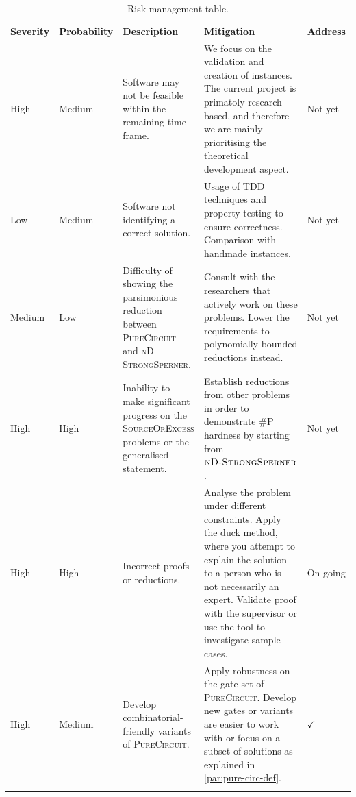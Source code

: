 \begin{xltabular}{0.95\linewidth}{|Z{1.2cm}|Z{1.75cm}|Y|Y|Z{1.2cm}|}
        \hline
        \textbf{Severity} & \textbf{Probability} & \textbf{Description} & \textbf{Mitigation} & \textbf{Address} \\
        \hhline{|=|=|=|=|=|}
        High   & Medium & Software may not be feasible within the remaining time frame. & We focus on the validation and creation of instances.
        The current project is primatoly research-based, and therefore we are mainly prioritising the theoretical development aspect. & Not yet      \\ \hline
        Low    & Medium & Software not identifying a correct solution. & Usage of TDD techniques and property testing to ensure correctness.  Comparison with handmade instances. & Not yet      \\ \hline
        Medium & Low    & Difficulty of showing the parsimonious reduction between  \textsc{PureCircuit} and  \textsc{nD-StrongSperner}. & Consult with the researchers that actively work on these problems. Lower the requirements
               to polynomially bounded reductions instead. &  Not yet \\ \hline
        High   & High   & Inability to make significant progress on the \textsc{SourceOrExcess} problems or the generalised statement. &
        Establish reductions from other problems in order to demonstrate \textsc{\#P} hardness by starting from $\textsc{nD-StrongSperner}$. & Not yet \\ \hline
        High   & High   & Incorrect proofs or reductions. &
        Analyse the problem under different constraints.
            Apply the duck method, where you attempt to explain the solution to a person who is not necessarily an expert. Validate proof with the supervisor or
               use the tool to investigate sample cases. & On-going  \\ \hline
        High   & Medium & Develop combinatorial-friendly variants of \textsc{PureCircuit}. & Apply robustness on the gate set of \textsc{PureCircuit}. Develop new gates or variants are easier to work with or focus
        on a subset of solutions as explained in \ref{par:pure-circ-def}. & $\checkmark$  \\ \hline
        \caption{Risk management table.} \label{tab:management:risk-management}
\end{xltabular}

%
%
